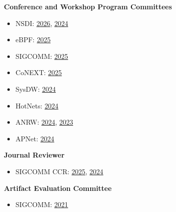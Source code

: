 \documentclass{article}
\newcommand{\postDoc}{}
\newcommand{\identity}[1]{#1}
\begin{document}
\identity{\noindent\hspace{1cm}}\identity{\textbf{Conference and Workshop Program Committees}}\identity{\begin{itemize}[leftmargin=1.5cm]\setlength{\itemsep}{0pt}}\identity{\item }NSDI\identity{: }\identity{\href{https://www.usenix.org/conference/nsdi26/call-for-papers}{2026}}, \identity{\href{https://www.usenix.org/conference/nsdi24/call-for-papers}{2024}}\identity{\item }eBPF\identity{: }\identity{\href{https://conferences.sigcomm.org/sigcomm/2025/workshop/ebpf/}{2025}}\identity{\item }SIGCOMM\identity{: }\identity{\href{https://conferences.sigcomm.org/sigcomm/2025/tpc/}{2025}}\identity{\item }CoNEXT\identity{: }\identity{\href{https://conferences.sigcomm.org/co-next/2025/\#!/pc}{2025}}\identity{\item }SysDW\identity{: }\identity{\href{https://sysdw24.github.io/}{2024}}\identity{\item }HotNets\identity{: }\identity{\href{https://conferences.sigcomm.org/hotnets/2024/program-committee/}{2024}}\identity{\item }ANRW\identity{: }\identity{\href{https://www.irtf.org/anrw/2024/committees.html}{2024}}, \identity{\href{https://www.irtf.org/anrw/2023/committees.html}{2023}}\identity{\item }APNet\identity{: }\identity{\href{https://conferences.sigcomm.org/events/apnet2024/pc.php}{2024}}\identity{\end{itemize}}\identity{\noindent\hspace{1cm}}\identity{\textbf{Journal Reviewer}}\identity{\begin{itemize}[leftmargin=1.5cm]\setlength{\itemsep}{0pt}}\identity{\item }SIGCOMM CCR\identity{: }\identity{\href{https://ccronline.sigcomm.org/editorial-board/}{2025}}, \identity{\href{https://ccronline.sigcomm.org/editorial-board/}{2024}}\identity{\end{itemize}}\identity{\noindent\hspace{1cm}}\identity{\textbf{Artifact Evaluation Committee}}\identity{\begin{itemize}[leftmargin=1.5cm]\setlength{\itemsep}{0pt}}\identity{\item }SIGCOMM\identity{: }\identity{\href{https://conferences.sigcomm.org/sigcomm/2021/cf-artifacts.html}{2021}}\identity{\end{itemize}}

\postDoc
\end{document}
